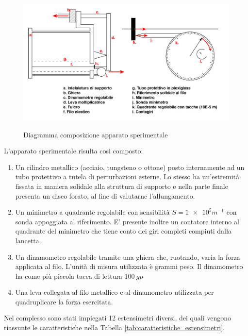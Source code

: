 \documentclass[a4paper,11pt,oneside]{article}
\begin{document}
\begin{figure}[h!]
    \centering
    \caption{Diagramma composizione apparato sperimentale}
    \includegraphics[width=12.5cm]{ApparatoSperimentale.jpg}
    \label{fig:apparato_sperimentale}
\end{figure}
L'apparato sperimentale risulta così composto:
\begin{enumerate}
    \item Un cilindro metallico (acciaio, tungsteno o ottone) posto internamente ad un tubo protettivo a tutela di perturbazioni esterne. Lo stesso ha un'estremità fissata in maniera solidale alla struttura di supporto e nella parte finale presenta un disco forato, al fine di valutarne l'allungamento.
    \item Un minimetro a quadrante regolabile con sensibilità $S=\num{1e5} \si{m^{-1}}$ con sonda appoggiata al riferimento. E' presente inoltre un contatore interno al quadrante del minimetro che tiene conto dei giri completi compiuti dalla lancetta.
    \item Un dinamometro regolabile tramite una ghiera che, ruotando, varia la forza applicata al filo. L'unità di misura utilizzata è grammi peso. Il dinamometro ha come più piccola tacca di lettura  $\SI{100}{gp}$
    \item Una leva collegata al filo metallico e al dinamometro utilizzata per quadruplicare la forza esercitata.
\end{enumerate}
Nel complesso sono stati impiegati 12 estensimetri diversi, dei quali vengono riassunte le caratteristiche nella Tabella \ref{tab:caratteristiche_estensimetri}.
\end{document}

